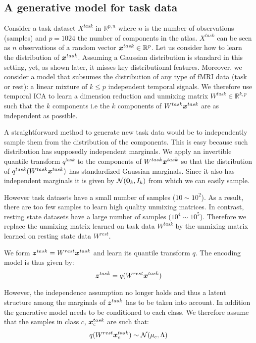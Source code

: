 \subsection{A generative model for task data}
Consider a task dataset $X^{task}$ in $\mathbb{R}^{p,n}$ where $n$ is the number of observations
(samples) and $p=1024$ the number of components in the atlas. $X^{task}$ can be seen as $n$
observations of a random vector $\boldsymbol{x}^{task} \in \mathbb{R}^p$. Let us
consider how to learn the distribution of $\boldsymbol{x}^{task}$. 
%
Assuming a Gaussian distribution is standard in this setting, yet, as
shown later, it misses key distributional features.
%
Moreover, we consider a model that subsumes the distribution of any type of
fMRI data (task or rest): a linear mixture of $k \leq p$ independent temporal signals.
%
We therefore use temporal ICA to learn a dimension reduction and unmixing matrix
$W^{task} \in \mathbb{R}^{k, p}$ such that the $k$ components i.e the $k$ components of
$W^{task} \boldsymbol{x}^{task}$ are as
independent as possible.

A straightforward method to generate new task data would be to
independently sample them from the distribution of the components.
%
This is easy because such distribution has supposedly independent marginals.
We apply an invertible quantile transform $q^{task}$ to the components of $W^{task} \boldsymbol{x}^{task}$ so that
the distribution of $q^{task}(W^{task} \boldsymbol{x}^{task})$ has standardized Gaussian
marginals. Since it also has independent marginals it is given by $\mathcal{N}({\boldsymbol{0}}_k, I_k)$
from which we can easily sample.

However task datasets   have a small number of samples ($10 \sim 10^2$). As a
result, there are too few samples to learn high quality unmixing matrices. In
contrast, resting state datasets have a large number of samples ($10^4 \sim 10^5$).
Therefore we replace the unmixing matrix learned on task data $W^{task}$ by the
unmixing matrix learned on resting state data $W^{rest}$.

We form $\boldsymbol{z}^{task} = W^{rest} \boldsymbol{x}^{task}$ and learn its quantile
transform $q$.
The encoding model is thus given by:
\begin{align}
  \boldsymbol{z}^{task} = q(W^{rest} \boldsymbol{x}^{task})
\end{align}

However, the independence assumption no longer holds and thus a latent structure among the marginals of
$\boldsymbol{z}^{task}$ has to be taken into account. In addition the generative model needs
to be conditioned to each class. We therefore assume that the samples in class
$c$, $\boldsymbol{x}_c^{task}$ are such that:
\begin{align}
q(W^{rest}\boldsymbol{x}^{task}_c) \sim \mathcal{N}( \mu_c, \Lambda)
\end{align}

